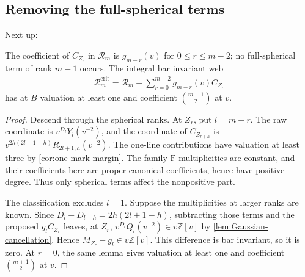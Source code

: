 \documentclass[a4paper,11pt]{amsart}
\numberwithin{equation}{subsection}
\theoremstyle{plain}
\theoremstyle{definition}
\theoremstyle{remark}
\begin{document}
\subsection{Removing the full-spherical terms}

Next up:

\begin{lemma}\label{prop:full-correction}
The coefficient of $C_{Z_r}$ in $\mathcal R_m$ is $g_{m-r}(v)$
for $0\le r\le m-2$; no full-spherical term of rank $m-1$ occurs.
The integral bar invariant web
\begin{gather*}
\mathcal R_m^{\mathrm{crit}}
=\mathcal R_m-\sum_{r=0}^{m-2}g_{m-r}(v)C_{Z_r}
\end{gather*}
has at $B$ valuation at least one and coefficient
$\binom{m+1}{2}$ at $v$.
\end{lemma}

\begin{proof}
Descend through the spherical ranks. At $Z_r$, put $l=m-r$.
The raw coordinate is $v^{D_l}Y_l(v^{-2})$, and the coordinate
of $C_{Z_{r+h}}$ is
$v^{2h(2l+1-h)}R_{2l+1,h}(v^{-2})$.
The one-line contributions have valuation at least three by
\autoref{cor:one-mark-margin}. The family $\mathrm F$
multiplicities are constant, and their coefficients here are
proper canonical coefficients, hence have positive degree.
Thus only spherical terms affect the nonpositive part.

The classification excludes $l=1$. Suppose the multiplicities
at larger ranks are known. Since
$D_l-D_{l-h}=2h(2l+1-h)$, subtracting those terms and the proposed
$g_lC_{Z_r}$ leaves, at $Z_r$,
$v^{D_l}Q_l(v^{-2})\in v\mathbb Z[v]$ by
\autoref{lem:Gaussian-cancellation}. Hence
$M_{Z_r}-g_l\in v\mathbb Z[v]$. This difference is bar invariant,
so it is zero. At $r=0$, the same lemma gives valuation at least
one and coefficient $\binom{m+1}{2}$ at $v$.
\end{proof}
\end{document}
